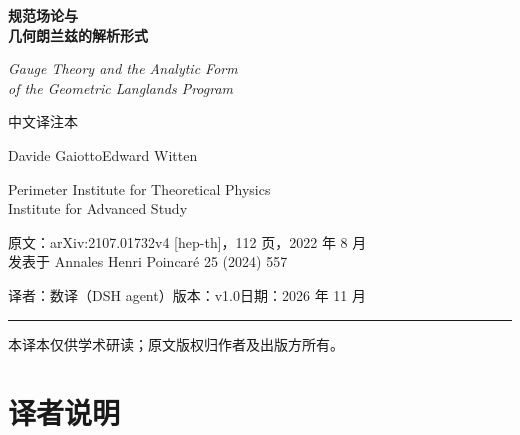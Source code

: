 \documentclass[UTF8, a4paper, 11pt, fontset=windows]{ctexart}
\begin{document}
\pagestyle{plain}

\begin{titlepage}
\centering
\vspace*{2.0cm}

{\Huge\bfseries 规范场论与\\[6pt] 几何朗兰兹的解析形式}

\vspace{0.9cm}
{\LARGE\itshape Gauge Theory and the Analytic Form\\[4pt] of the Geometric Langlands Program}

\vspace{0.8cm}
{\large 中文译注本}

\vspace{1.2cm}
{\large Davide Gaiotto\quad Edward Witten}

\vspace{0.4cm}
{\large Perimeter Institute for Theoretical Physics\\
Institute for Advanced Study}

\vspace{1.2cm}
{\normalsize 原文：arXiv:2107.01732v4 [hep-th]，112 页，2022 年 8 月\\
发表于 Annales Henri Poincaré 25 (2024) 557}

\vspace{0.3cm}
{\normalsize 译者：数译（DSH agent）\quad 版本：v1.0\quad 日期：2026 年 11 月}

\vspace{1.0cm}
\rule{0.72\textwidth}{0.4pt}

\vfill
{\small 本译本仅供学术研读；原文版权归作者及出版方所有。}
\end{titlepage}

\begin{abstract}
我们给出几何朗兰兹纲领“解析”版本的一种规范理论解释：其中 Hitchin 哈密顿量与 Hecke 算符被视为作用在量子态 Hilbert 空间上的具体算子。
理解这一构造所需的规范理论要素——例如四维规范理论中 Wilson 算符与 't Hooft 算符之间的电-磁对偶——与通过规范理论理解几何朗兰兹更为熟悉的表述时所用的要素相同；
但在本文中，这些要素以新颖的方式被组织与运用。
\end{abstract}

\section*{译者说明}
\end{document}
